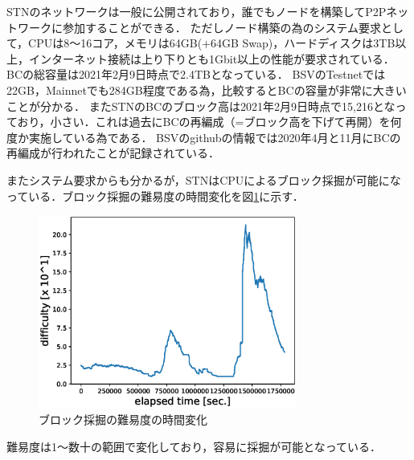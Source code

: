 \documentclass[graybox]{svmult}
\begin{document}
STNのネットワークは一般に公開されており，誰でもノードを構築してP2Pネットワークに参加することができる．
ただしノード構築の為のシステム要求として，CPUは8〜16コア，メモリは64GB(+64GB Swap)，ハードディスクは3TB以上，インターネット接続は上り下りとも1Gbit以上の性能が要求されている．
BCの総容量は2021年2月9日時点で2.4TBとなっている．
BSVのTestnetでは22GB，Mainnetでも284GB程度である為，比較するとBCの容量が非常に大きいことが分かる．
またSTNのBCのブロック高は2021年2月9日時点で15,216となっており，小さい．これは過去にBCの再編成（=ブロック高を下げて再開）を何度か実施している為である．
BSVのgithubの情報では2020年4月と11月にBCの再編成が行われたことが記録されている．

またシステム要求からも分かるが，STNはCPUによるブロック採掘が可能になっている．ブロック採掘の難易度の時間変化を図\ref{fig:difficulty}に示す．
%
\begin{figure}[t]
  \vspace{-45mm}
  \begin{center}
    \includegraphics[width=85mm]{time_vs_difficulty-plot.eps}
  \end{center}
  \vspace{45mm}
  \caption{ブロック採掘の難易度の時間変化}
  \label{fig:difficulty}
\end{figure}
%
難易度は1〜数十の範囲で変化しており，容易に採掘が可能となっている．
\end{document}
